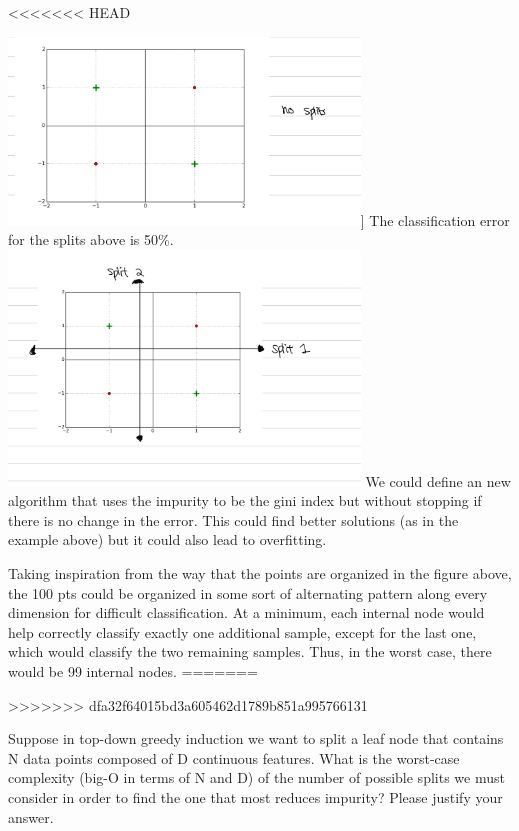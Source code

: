 \begin{solution}
<<<<<<< HEAD
    \begin{center}
        \includegraphics[width=0.7\textwidth]{d1.jpeg}] \newline
        The classification error for the splits above is 50\%.
        \includegraphics[width=0.7\textwidth]{d3.jpeg} \newline
        We could define an new algorithm that uses the impurity to be the gini index but without stopping if there is no change in the error. This could find better solutions (as in the example above) but it could also lead to overfitting.
    \end{center}
    
    Taking inspiration from the way that the points are organized in the figure above, the 100 pts could be organized in some sort of alternating pattern along every dimension for difficult classification. At a minimum, each internal node would help correctly classify exactly one additional sample, except for the last one, which would classify the two remaining samples. Thus, in the worst case, there would be 99 internal nodes.
=======

>>>>>>> dfa32f64015bd3a605462d1789b851a995766131
\end{solution}

\problem[4] Suppose in top-down greedy induction we want to split a leaf node that contains N data points composed of
D continuous features. What is the worst-case
complexity (big-O in terms of N and D) of the number of possible splits we must consider in order to find the one that most reduces impurity? Please justify your answer.

